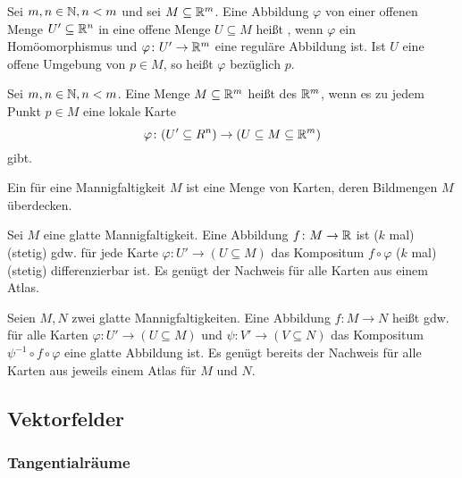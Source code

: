 \begin{definition}
Sei $m,n\in\mathbb N, n<m$ und sei $M\subseteq\mathbb R^m$.
Eine Abbildung $\varphi$ von einer offenen Menge $U'\subseteq\mathbb R^n$
in eine offene Menge $U\subseteq M$ heißt ,
wenn $\varphi$ ein Homöomorphismus und $\varphi\colon U'\to\mathbb R^m$
eine reguläre Abbildung ist. Ist $U$ eine offene Umgebung von
$p\in M$, so heißt $\varphi$  bezüglich $p$.
\end{definition}
\pagebreak[1]

\begin{definition}
Sei $m,n\in\mathbb N, n<m$. Eine Menge $M\subseteq\mathbb R^m$ heißt
 des $\mathbb R^m$, wenn
es zu jedem Punkt $p\in M$ eine lokale Karte
\begin{equation}
\varphi\colon (U'\subseteq R^n)\to (U\subseteq M\subseteq\mathbb R^m)
\end{equation}
gibt.
\end{definition}

\begin{definition}[Atlas]
Ein  für eine Mannigfaltigkeit $M$
ist eine Menge von Karten, deren Bildmengen $M$ überdecken.
\end{definition}

\begin{definition}
Sei $M$ eine glatte Mannigfaltigkeit.
Eine Abbildung $f\colon M\to\mathbb R$ ist ($k$ mal) (stetig)
gdw. für jede Karte $\varphi\colon U'\to (U\subseteq M)$ das
Kompositum $f\circ\varphi$ ($k$ mal) (stetig) differenzierbar ist.
Es genügt der Nachweis für alle Karten aus einem Atlas.
\end{definition}

\begin{definition}
Seien $M,N$ zwei glatte Mannigfaltigkeiten.
Eine Abbildung $f\colon M\to N$ heißt 
gdw. für alle Karten $\varphi\colon U'\to (U\subseteq M)$ und
$\psi\colon V'\to (V\subseteq N)$ das Kompositum
$\psi^{-1}\circ f\circ\varphi$ eine glatte Abbildung ist.
Es genügt bereits der Nachweis für alle Karten aus jeweils einem
Atlas für $M$ und $N$.
\end{definition}

\subsection{Vektorfelder}
\subsubsection{Tangentialräume}

